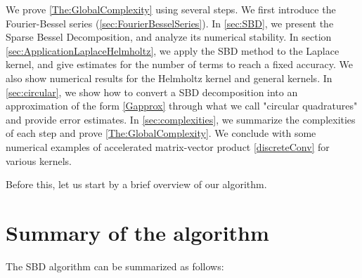 \documentclass[smallextended]{svjour3}
\begin{document}
We prove \autoref{The:GlobalComplexity} using several steps. We first introduce the Fourier-Bessel series (\autoref{sec:FourierBesselSeries}). In \autoref{sec:SBD}, we present the Sparse Bessel Decomposition, and analyze its numerical stability. In section \autoref{sec:ApplicationLaplaceHelmholtz}, we apply the SBD method to the Laplace kernel, and give estimates for the number of terms to reach a fixed accuracy. We also show numerical results for the Helmholtz kernel and general kernels. In \autoref{sec:circular}, we show how to convert a SBD decomposition into an approximation of the form \eqref{Gapprox} through what we call "circular quadratures" and provide error estimates. In \autoref{sec:complexities}, we summarize the complexities of each step and prove \autoref{The:GlobalComplexity}. We conclude with some numerical examples of accelerated matrix-vector product \eqref{discreteConv} for various kernels. 

Before this, let us start by a brief overview of our algorithm.

\section{Summary of the algorithm}
\setcounter{equation}{0}
\label{sec:overview}

The SBD algorithm can be summarized as follows:
\end{document}
